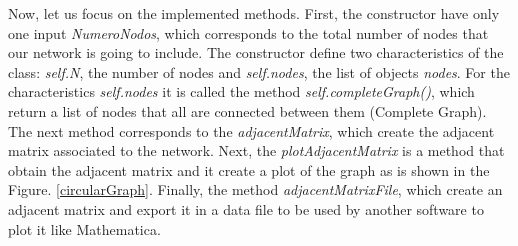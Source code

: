 \documentclass{article}
\begin{document}
Now, let us focus on the implemented methods. First, the constructor have only one input \textit{NumeroNodos}, which corresponds to the total number of nodes that our network is going to include. The constructor define two characteristics of the class: \textit{self.N}, the number of nodes and \textit{self.nodes}, the list of objects \textit{nodes}. For the characteristics \textit{self.nodes} it is called the method \textit{self.completeGraph()}, which return a list of nodes that all are connected between them (Complete Graph). The next method corresponds to the \textit{adjacentMatrix}, which create the adjacent matrix associated to the network. Next, the \textit{plotAdjacentMatrix} is a method that obtain the adjacent matrix and it create a plot of the graph as is shown in the Figure. \ref{circularGraph}. Finally, the method \textit{adjacentMatrixFile}, which create an adjacent matrix and export it in a data file to be used by another software to plot it like Mathematica.
\end{document}
